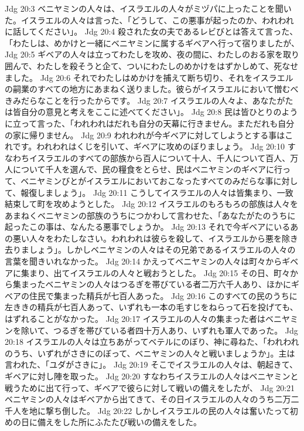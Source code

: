 Jdg 20:3  ベニヤミンの人々は、イスラエルの人々がミヅパに上ったことを聞いた。イスラエルの人々は言った、「どうして、この悪事が起ったのか、われわれに話してください」。
Jdg 20:4  殺された女の夫であるレビびとは答えて言った、「わたしは、めかけと一緒にベニヤミンに属するギベアへ行って宿りましたが、
Jdg 20:5  ギベアの人々は立ってわたしを攻め、夜の間に、わたしのおる家を取り囲んで、わたしを殺そうと企て、ついにわたしのめかけをはずかしめて、死なせました。
Jdg 20:6  それでわたしはめかけを捕えて断ち切り、それをイスラエルの嗣業のすべての地方にあまねく送りました。彼らがイスラエルにおいて憎むべきみだらなことを行ったからです。
Jdg 20:7  イスラエルの人々よ、あなたがたは皆自分の意見と考えをここに述べてください」。
Jdg 20:8  民は皆ひとりのように立って言った、「われわれはだれも自分の天幕に行きません。まただれも自分の家に帰りません。
Jdg 20:9  われわれが今ギベアに対してしようとする事はこれです。われわれはくじを引いて、ギベアに攻めのぼりましょう。
Jdg 20:10  すなわちイスラエルのすべての部族から百人について十人、千人について百人、万人について千人を選んで、民の糧食をとらせ、民はベニヤミンのギベアに行って、ベニヤミンびとがイスラエルにおいておこなったすべてのみだらな事に対して、報復しましょう」。
Jdg 20:11  こうしてイスラエルの人々は皆集まり、一致結束して町を攻めようとした。
Jdg 20:12  イスラエルのもろもろの部族は人々をあまねくベニヤミンの部族のうちにつかわして言わせた、「あなたがたのうちに起ったこの事は、なんたる悪事でしょうか。
Jdg 20:13  それで今ギベアにいるあの悪い人々をわたしなさい。われわれは彼らを殺して、イスラエルから悪を除き去りましょう」。しかしベニヤミンの人々はその兄弟であるイスラエルの人々の言葉を聞きいれなかった。
Jdg 20:14  かえってベニヤミンの人々は町々からギベアに集まり、出てイスラエルの人々と戦おうとした。
Jdg 20:15  その日、町々から集まったベニヤミンの人々はつるぎを帯びている者二万六千人あり、ほかにギベアの住民で集まった精兵が七百人あった。
Jdg 20:16  このすべての民のうちに左ききの精兵が七百人あって、いずれも一本の毛すじをねらって石を投げても、はずれることがなかった。
Jdg 20:17  イスラエルの人々の集まった者はベニヤミンを除いて、つるぎを帯びている者四十万人あり、いずれも軍人であった。
Jdg 20:18  イスラエルの人々は立ちあがってベテルにのぼり、神に尋ねた、「われわれのうち、いずれがさきにのぼって、ベニヤミンの人々と戦いましょうか」。主は言われた、「ユダがさきに」。
Jdg 20:19  そこでイスラエルの人々は、朝起きて、ギベアに対し陣を取った。
Jdg 20:20  すなわちイスラエルの人々はベニヤミンと戦うために出て行って、ギベアで彼らに対して戦いの備えをしたが、
Jdg 20:21  ベニヤミンの人々はギベアから出てきて、その日イスラエルの人々のうち二万二千人を地に撃ち倒した。
Jdg 20:22  しかしイスラエルの民の人々は奮いたって初めの日に備えをした所にふたたび戦いの備えをした。
